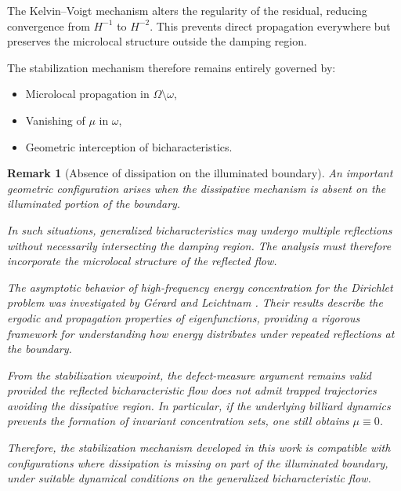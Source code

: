 \documentclass[11pt,letterpaper]{amsart}
\newtheorem{remark}[theorem]{Remark}
\begin{document}
The Kelvin--Voigt mechanism alters the regularity of the residual,
reducing convergence from $H^{-1}$ to $H^{-2}$. This prevents direct
propagation everywhere but preserves the microlocal structure outside
the damping region.

The stabilization mechanism therefore remains entirely governed by:

\begin{itemize}
\item Microlocal propagation in $\Omega \setminus \omega$,
\item Vanishing of $\mu$ in $\omega$,
\item Geometric interception of bicharacteristics.
\end{itemize}



\begin{remark}[Absence of dissipation on the illuminated boundary]
\label{rem:illuminated_boundary}
An important geometric configuration arises when the dissipative mechanism
is absent on the illuminated portion of the boundary.

In such situations, generalized bicharacteristics may undergo multiple
reflections without necessarily intersecting the damping region. The
analysis must therefore incorporate the microlocal structure of the
reflected flow.

The asymptotic behavior of high-frequency energy concentration for the
Dirichlet problem was investigated by G\'erard and Leichtnam
\cite{Gerard-Leicthnam}. Their results describe the ergodic and propagation
properties of eigenfunctions, providing a rigorous framework for
understanding how energy distributes under repeated reflections at the
boundary.

From the stabilization viewpoint, the defect-measure argument remains
valid provided the reflected bicharacteristic flow does not admit trapped
trajectories avoiding the dissipative region. In particular, if the
underlying billiard dynamics prevents the formation of invariant
concentration sets, one still obtains $\mu \equiv 0$.

Therefore, the stabilization mechanism developed in this work is compatible
with configurations where dissipation is missing on part of the illuminated
boundary, under suitable dynamical conditions on the generalized
bicharacteristic flow.
\end{remark}

\appendix
\end{document}
